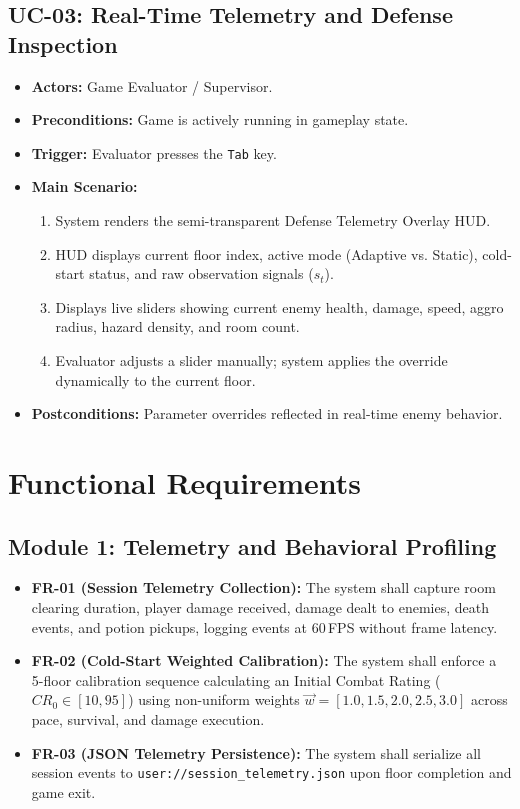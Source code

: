 \subsection{UC-03: Real-Time Telemetry and Defense Inspection}
\begin{itemize}
    \item \textbf{Actors:} Game Evaluator / Supervisor.
    \item \textbf{Preconditions:} Game is actively running in gameplay state.
    \item \textbf{Trigger:} Evaluator presses the \texttt{Tab} key.
    \item \textbf{Main Scenario:}
    \begin{enumerate}
        \item System renders the semi-transparent Defense Telemetry Overlay HUD.
        \item HUD displays current floor index, active mode (Adaptive vs. Static), cold-start status, and raw observation signals ($s_t$).
        \item Displays live sliders showing current enemy health, damage, speed, aggro radius, hazard density, and room count.
        \item Evaluator adjusts a slider manually; system applies the override dynamically to the current floor.
    \end{enumerate}
    \item \textbf{Postconditions:} Parameter overrides reflected in real-time enemy behavior.
\end{itemize}

\section{Functional Requirements}

\subsection{Module 1: Telemetry and Behavioral Profiling}
\begin{itemize}
    \item \textbf{FR-01 (Session Telemetry Collection):} The system shall capture room clearing duration, player damage received, damage dealt to enemies, death events, and potion pickups, logging events at 60\,FPS without frame latency.
    \item \textbf{FR-02 (Cold-Start Weighted Calibration):} The system shall enforce a 5-floor calibration sequence calculating an Initial Combat Rating ($CR_0 \in [10, 95]$) using non-uniform weights $\vec{w} = [1.0, 1.5, 2.0, 2.5, 3.0]$ across pace, survival, and damage execution.
    \item \textbf{FR-03 (JSON Telemetry Persistence):} The system shall serialize all session events to \texttt{user://session\_telemetry.json} upon floor completion and game exit.
\end{itemize}

